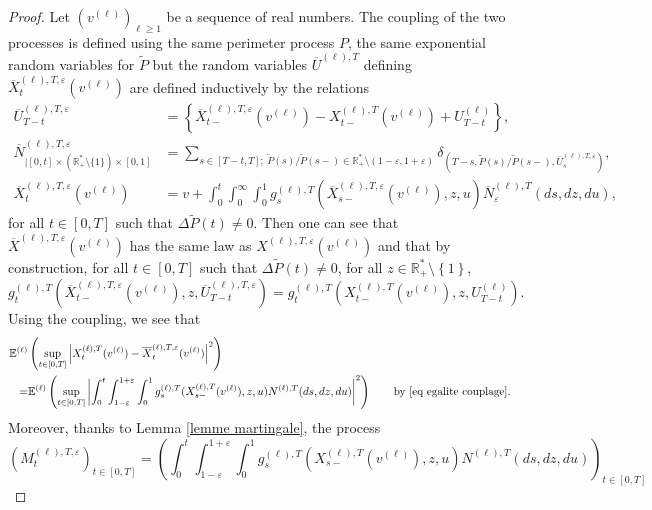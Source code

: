 \documentclass[11pt]{article}
\numberwithin{equation}{section}
\def\vp{\varepsilon}
\def \R{\mathbb {R}}
\def\E{\mathbb{E}}
\begin{document}
\begin{proof}
Let $(v^{(\ell)})_{\ell \ge 1}$ be a sequence of real numbers. The coupling of the two processes is defined using the same perimeter process $P$, the same exponential random variables for $\widetilde{P}$ but the random variables $\overline{U}^{(\ell),T}$ defining $\overline{X}^{(\ell),T,\vp}_t(v^{(\ell)})$ are defined inductively by the relations
\begin{align}
\overline{U}_{T-t}^{(\ell),T,\vp}&= \left\{ \overline{X}^{(\ell),T,\vp}_{t-}(v^{(\ell)}) - X^{(\ell),T}_{t-}(v^{(\ell)}) + U^{(\ell)}_{T-t}\right\}, \\
\overline{N}^{(\ell),T,\vp}_{\vert [0,t]\times (\R^*_+\setminus \{1\})\times [0,1]} 
&= \sum_{s\in [T-t,T]; \ \widetilde{P}(s)/\widetilde{P}(s-) \in \R_+^*\setminus (1-\vp, 1+\vp)} \delta_{(T-s,\widetilde{P}(s)/\widetilde{P}(s-), \overline{U}^{(\ell),T,\vp}_{s})}, \\
\overline{X}^{(\ell),T,\vp}_t(v^{(\ell)}) &= v+ \int_0^t \int_0^\infty \int_0^1 g^{(\ell),T}_s(\overline{X}^{(\ell),T,\vp}_{s-}(v^{(\ell)}),z,u) \overline{N}^{(\ell), T}_\vp(ds,dz,du),
\end{align}
for all $t\in [0,T]$ such that $\Delta \widetilde{P}(t)\neq 0$. Then one can see that $\overline{X}^{(\ell),T,\vp}(v^{(\ell)})$ has the same law as ${X}^{(\ell),T,\vp}(v^{(\ell)})$ and that by construction, for all $t\in [0,T]$ such that $\Delta \widetilde{P}(t)\neq 0$, for all $z \in \R_+^*\setminus \left\{1\right\}$, 
\begin{equation}\label{eq egalite couplage}
g^{(\ell),T}_t(\overline{X}^{(\ell),T,\vp}_{t-}(v^{(\ell)}), z, \overline{U}_{T-t}^{(\ell),T,\vp}) = g^{(\ell),T}_t(X^{(\ell),T}_{t-}(v^{(\ell)}), z, U^{(\ell)}_{T-t}).
\end{equation}
Using the coupling, we see that
\begin{align*}
\E^{(\ell)} 
&\left(\sup_{t\in [0,T]} 
\left|
X^{(\ell),T}_t(v^{(\ell)})
-
\overline{X}^{(\ell),T,\vp}_t(v^{(\ell)})
\right|^2
\right)
\\
=
&\E^{(\ell)} 
\left(\sup_{t\in [0,T]} 
\left|
\int_0^t \int_{1-\vp}^{1+\vp} \int_0^1
g^{(\ell),T}_s(X^{(\ell),T}_{s-}(v^{(\ell)}),z,u)
N^{(\ell),T}(ds, dz, du)
\right|^2
\right)
\qquad
\text{by } \eqref{eq egalite couplage}.
\end{align*}
Moreover, thanks to Lemma \ref{lemme martingale}, the process
$$
(M_t^{(\ell),T,\vp})_{t \in [0,T]}
=
\left(
\int_{0}^t
\int_{1-\vp}^{1+\vp}
\int_0^1
g^{(\ell),T}_s(X^{(\ell),T}_{s-}(v^{(\ell)}),z,u) {N}^{(\ell),T} (ds, dz, du)
\right)_{t \in [0,T]}
$$
\end{proof}
\end{document}
